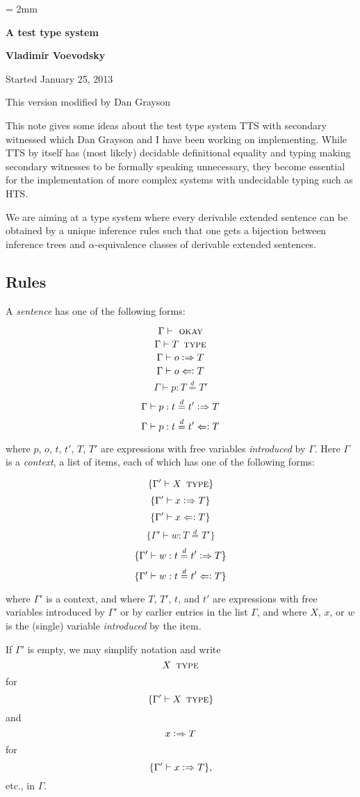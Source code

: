 \documentclass[11pt]{article}
\newcommand{\eqd}{\stackrel{d}{=}}
\newcommand{\synth}{\vcentcolon\Rightarrow}
\newcommand{\ccheck}{\Leftarrow\vcentcolon}
\newcommand{\Type}{\mathop{\text{ \sc type}}}
\newcommand{\Okay}{\mathop{\text{ \sc okay}}}
\begin{document}
\parskip = 2mm
\begin{center}
{\bf\Large A test type system}

{\bf Vladimir Voevodsky}

{Started January 25, 2013}  

{This version modified by Dan Grayson}  
\end{center}

\tableofcontents

This note gives some ideas about the test type system TTS with secondary
witnessed which Dan Grayson and I have been working on implementing. While TTS
by itself has (most likely) decidable definitional equality and typing making
secondary witnesses to be formally speaking unnecessary, they become essential
for the implementation of more complex systems with undecidable typing such as
HTS.

We are aiming at a type system where every derivable extended sentence can be
obtained by a unique inference rules such that one gets a bijection between
inference trees and $\alpha$-equivalence classes of derivable extended
sentences.

\subsection{Rules}

A {\em sentence} has one of the following forms:

$$\Gamma\vdash \Okay$$
$$\Gamma\vdash T \Type$$
$$\Gamma\vdash o \synth T$$
$$\Gamma\vdash o \ccheck T$$
$$\Gamma\vdash p : T \eqd T'$$
$$\Gamma\vdash p : t \eqd t' \synth T$$
$$\Gamma\vdash p : t \eqd t' \ccheck T$$

where $p$, $o$, $t$, $t'$, $T$, $T'$ are expressions with free variables {\em
  introduced} by $\Gamma$.  Here $\Gamma$ is a {\em context}, a list of items,
each of which has one of the following forms:

$$\{ \Gamma'\vdash X \Type \}$$
$$\{ \Gamma'\vdash x \synth T \}$$
$$\{ \Gamma'\vdash x \ccheck T \}$$
$$\{ \Gamma'\vdash w : T \eqd T'\}$$
$$\{ \Gamma'\vdash w : t \eqd t' \synth T \}$$
$$\{ \Gamma'\vdash w : t \eqd t' \ccheck T \}$$

where $\Gamma'$ is a context, and where $T$, $T'$, $t$, and $t'$ are
expressions with free variables introduced by $\Gamma'$ or by earlier entries
in the list $\Gamma$, and where $X$, $x$, or $w$ is the (single) variable {\em
  introduced} by the item.

If $\Gamma'$ is empty, we may simplify notation and write
$$ X \Type $$
for
$$\{ \Gamma'\vdash X \Type \}$$
and
$$x \synth T$$
for
$$\{ \Gamma'\vdash x \synth T \},$$
etc., in $\Gamma$.
\end{document}
